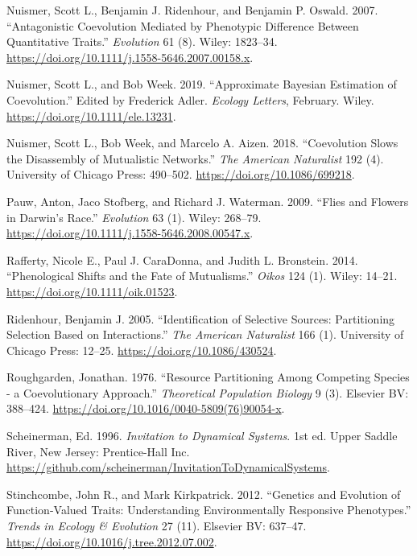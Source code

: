 \documentclass[]{article}
\begin{document}
\leavevmode\hypertarget{ref-Nuismer2007}{}%
Nuismer, Scott L., Benjamin J. Ridenhour, and Benjamin P. Oswald. 2007.
``Antagonistic Coevolution Mediated by Phenotypic Difference Between
Quantitative Traits.'' \emph{Evolution} 61 (8). Wiley: 1823--34.
\url{https://doi.org/10.1111/j.1558-5646.2007.00158.x}.

\leavevmode\hypertarget{ref-Nuismer2019}{}%
Nuismer, Scott L., and Bob Week. 2019. ``Approximate Bayesian Estimation
of Coevolution.'' Edited by Frederick Adler. \emph{Ecology Letters},
February. Wiley. \url{https://doi.org/10.1111/ele.13231}.

\leavevmode\hypertarget{ref-Nuismer2018}{}%
Nuismer, Scott L., Bob Week, and Marcelo A. Aizen. 2018. ``Coevolution
Slows the Disassembly of Mutualistic Networks.'' \emph{The American
Naturalist} 192 (4). University of Chicago Press: 490--502.
\url{https://doi.org/10.1086/699218}.

\leavevmode\hypertarget{ref-Pauw2009}{}%
Pauw, Anton, Jaco Stofberg, and Richard J. Waterman. 2009. ``Flies and
Flowers in Darwin's Race.'' \emph{Evolution} 63 (1). Wiley: 268--79.
\url{https://doi.org/10.1111/j.1558-5646.2008.00547.x}.

\leavevmode\hypertarget{ref-Rafferty2014}{}%
Rafferty, Nicole E., Paul J. CaraDonna, and Judith L. Bronstein. 2014.
``Phenological Shifts and the Fate of Mutualisms.'' \emph{Oikos} 124
(1). Wiley: 14--21. \url{https://doi.org/10.1111/oik.01523}.

\leavevmode\hypertarget{ref-Ridenhour2005}{}%
Ridenhour, Benjamin J. 2005. ``Identification of Selective Sources:
Partitioning Selection Based on Interactions.'' \emph{The American
Naturalist} 166 (1). University of Chicago Press: 12--25.
\url{https://doi.org/10.1086/430524}.

\leavevmode\hypertarget{ref-Roughgarden1976}{}%
Roughgarden, Jonathan. 1976. ``Resource Partitioning Among Competing
Species - a Coevolutionary Approach.'' \emph{Theoretical Population
Biology} 9 (3). Elsevier BV: 388--424.
\url{https://doi.org/10.1016/0040-5809(76)90054-x}.

\leavevmode\hypertarget{ref-schei1996}{}%
Scheinerman, Ed. 1996. \emph{Invitation to Dynamical Systems}. 1st ed.
Upper Saddle River, New Jersey: Prentice-Hall Inc.
\url{https://github.com/scheinerman/InvitationToDynamicalSystems}.

\leavevmode\hypertarget{ref-Stinchcombe2012}{}%
Stinchcombe, John R., and Mark Kirkpatrick. 2012. ``Genetics and
Evolution of Function-Valued Traits: Understanding Environmentally
Responsive Phenotypes.'' \emph{Trends in Ecology \& Evolution} 27 (11).
Elsevier BV: 637--47. \url{https://doi.org/10.1016/j.tree.2012.07.002}.
\end{document}
